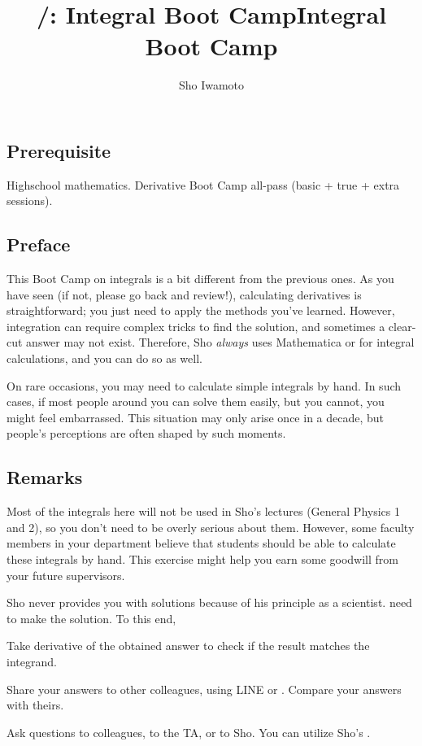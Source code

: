 \documentclass[11pt,pdfa,lastpage]{MishoNote}
\title{\LectureName/: Integral Boot Camp}
\author{Sho Iwamoto}
\let\origfootnote\footnote
\let\origfootnoterule\footnoterule
\begin{document}
%
\title{Integral Boot Camp}
\begin{maketitle}
\let\footnote\origfootnote
\let\footnoterule\origfootnoterule

\subsection*{Prerequisite}
Highschool mathematics. Derivative Boot Camp all-pass (basic + true + extra sessions).

\subsection*{Preface}
This Boot Camp on integrals is a bit different from the previous ones.
As you have seen (if not, please go back and review!), calculating derivatives is straightforward; you just need to apply the methods you've learned.
However, integration can require complex tricks to find the solution, and sometimes a clear-cut answer may not exist.
Therefore, Sho \emph{always} uses Mathematica or  for integral calculations, and you can do so as well.

On rare occasions, you may need to calculate simple integrals by hand.
In such cases, if most people around you can solve them easily, but you cannot, you might feel embarrassed.
This situation may only arise once in a decade, but people's perceptions are often shaped by such moments.

\subsection*{Remarks}
Most of the integrals here will not be used in Sho's lectures (General Physics 1 and 2), so you don't need to be overly serious about them.
However, some faculty members in your department believe that students should be able to calculate these integrals by hand.
This exercise might help you earn some goodwill from your future supervisors.

\medskip

Sho never provides you with solutions because of his principle as a scientist.
 need to make the solution. To this end,
\begin{miniitemize}
  \item Take derivative of the obtained answer to check if the result matches the integrand.
  \item Share your answers to other colleagues, using LINE or . Compare your answers with theirs.
  \item Ask questions to colleagues, to the TA, or to Sho. You can utilize Sho's .
\end{miniitemize}


\end{maketitle}
\end{document}
